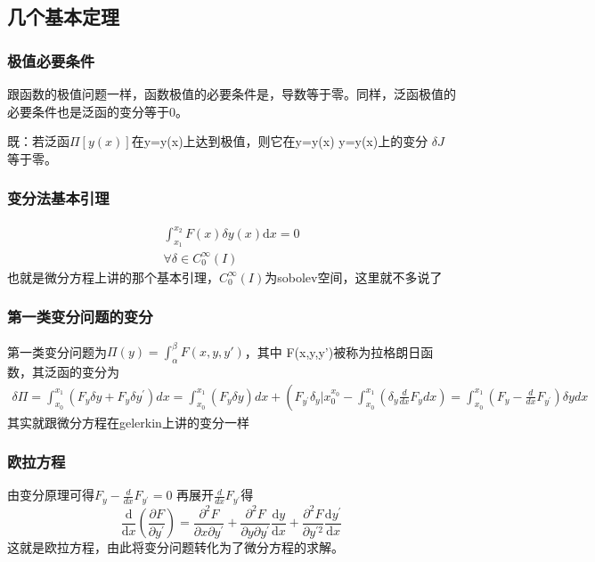 \documentclass{article}
\begin{document}
	    \subsection{几个基本定理}
	    
	    \subsubsection{极值必要条件}
	    跟函数的极值问题一样，函数极值的必要条件是，导数等于零。同样，泛函极值的必要条件也是泛函的变分等于0。
	    
	    既：若泛函$\varPi [y(x)] $在y=y(x)上达到极值，则它在y=y(x) y=y(x)上的变分 $\delta{J}$等于零。
	    
	     \subsubsection{变分法基本引理}
	    \begin{equation}
	    \begin{split}
	    \int_{x_{1}}^{x_{2}} F(x) \delta y(x) \mathrm{d} x=0\\
	    \forall \delta\in C^{\infty}_{0}(I)
	    \end{split}
	    \end{equation}
	    也就是微分方程上讲的那个基本引理，$C^{\infty}_{0}(I)$为sobolev空间，这里就不多说了
	    
	   \subsubsection{第一类变分问题的变分}
	   第一类变分问题为$\varPi(y)=\int_{\alpha}^{\beta} F(x,y,y')$，其中 F(x,y,y')被称为拉格朗日函数，其泛函的变分为
	  \begin{equation}
	  \begin{split}
	  \delta \varPi=\int_{x_{0}}^{x_{1}}\left(F_{y} \delta y+F_{y} \delta y^{\prime}\right) d x=\int_{x_{0}}^{x_{1}}\left(F_{y} \delta y\right) d x+\left(F_{y^{\prime}} \delta_{y} | x_{0}^{x_{0}}-\int_{x_{0}}^{x_{1}}\left(\delta_{y} \frac{d}{d x} F_{y} d x\right)=\int_{x_{0}}^{x_{1}}\left(F_{y}-\frac{d}{d x} F_{y^{\prime}}\right) \delta y d x\right.
	  \end{split}
	  \end{equation}
	    其实就跟微分方程在gelerkin上讲的变分一样
	    
	   \subsubsection{欧拉方程}
	   由变分原理可得$F_{y}-\frac{d}{d x} F_{y^{\prime}}=0$
	   再展开$\frac{d}{d x} F_{y^{\prime}}$得
	   \begin{equation}
	   \frac{\mathrm{d}}{\mathrm{d} x}\left(\frac{\partial F}{\partial y^{\prime}}\right)=\frac{\partial^{2} F}{\partial x \partial y^{\prime}}+\frac{\partial^{2} F}{\partial y \partial y^{\prime}} \frac{\mathrm{d} y}{\mathrm{d} x}+\frac{\partial^{2} F}{\partial y^{\prime 2}} \frac{\mathrm{d} y^{\prime}}{\mathrm{d} x}
	   \end{equation}
	   这就是欧拉方程，由此将变分问题转化为了微分方程的求解。
       
\end{document}
